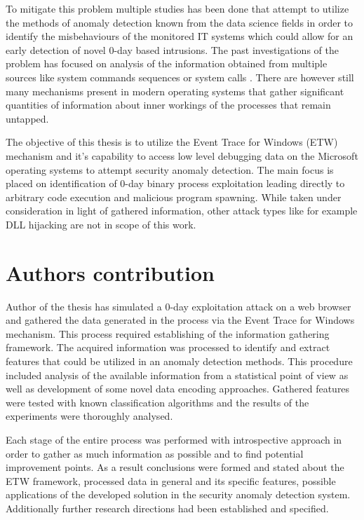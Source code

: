 \documentclass[a4paper,twoside,12pt]{book}
\begin{document}
To mitigate this problem multiple studies has been done that attempt to utilize the methods of
anomaly detection known from the data science fields in order to identify the misbehaviours of 
the monitored IT systems which could allow for an early detection of novel 0-day based intrusions.
The past investigations of the problem has focused on analysis of the information obtained from 
multiple sources like system commands sequences \cite{bib:lane1997application} or system calls 
\cite{bib:rsvm}. There are however still many mechanisms present in modern operating systems 
that gather significant quantities of information about inner workings of the processes that remain
untapped. 

The objective of this thesis is to utilize the Event Trace for Windows (ETW) mechanism and it's 
capability to access low level debugging data on the Microsoft operating systems to attempt
security anomaly detection. The main focus is placed on identification of 0-day binary process 
exploitation leading directly to arbitrary code execution and malicious program spawning. While 
taken under consideration in light of gathered information, other attack types like for example 
DLL hijacking are not in scope of this work.

\section{Authors contribution}

Author of the thesis has simulated a 0-day exploitation attack on a web browser and gathered 
the data generated in the process via the Event Trace for Windows mechanism. This process 
required establishing of the information gathering framework. The acquired 
information was processed to identify and extract features that could be utilized in an anomaly detection
methods. This procedure included analysis of the available information from a statistical point of view
as well as development of some novel data encoding approaches. Gathered 
features were tested with known classification algorithms and the results of the experiments were thoroughly analysed.

Each stage of the entire process was performed with introspective approach in order to gather as much information 
as possible and to find potential improvement points. As a result conclusions were formed and stated about
the ETW framework, processed data in general and its specific features, possible applications of the developed
solution in the security anomaly detection system. Additionally further research directions had been established and specified.
\end{document}

